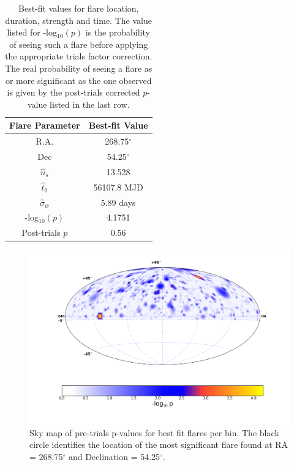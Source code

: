 \documentclass{gatech-thesis}
\begin{document}
\begin{table}[h]
\caption[Best-fit signal parameters]{Best-fit values for flare location, duration, strength and time. The value listed for -log$_{10}(p)$ is the probability of seeing such a flare before applying the appropriate trials factor correction. The real probability of seeing a flare as or more significant as the one observed is given by the post-trials corrected $p$-value listed in the last row.\label{tab:best_fit_flare}}
\begin{center}
\begin{tabular}{cc}
  \toprule
 \textbf{Flare Parameter} &\textbf{ Best-fit Value} \\
\midrule
R.A. & 268.75$^{\circ}$ \\ 
Dec & 54.25$^{\circ}$ \\ 
$\hat{n}_s$ & 13.528 \\ 
$\hat{t}_0$ & 56107.8 MJD \\ 
$\hat{\sigma}_w$ & 5.89 days \\ 
-log$_{10}(p)$ & 4.1751 \\
Post-trials $p$ & 0.56 \\
\end{tabular}
\end{center}
\end{table}

\begin{figure}[ht]
  \begin{center}
    \includegraphics[width=1.0\textwidth,keepaspectratio]{RealResultSkyMap.png}
  \end{center}
  \caption[Results Sky Map]{Sky map of pre-trials p-values for best fit flares per bin. The black circle identifies the location of the most significant flare found at RA = 268.75$^\circ$ and Declination = 54.25$^\circ$.}
  \label{fig:RealSkyMap}
\end{figure}
\end{document}
